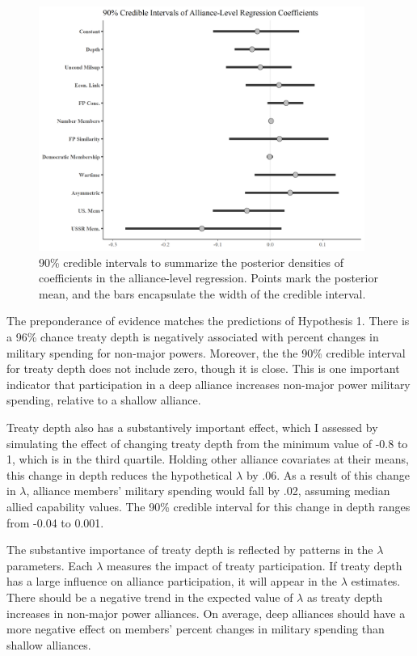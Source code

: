 \documentclass[12pt]{article}
\begin{document}
\begin{figure}[htbp]
	\centering
		\includegraphics[width=0.95\textwidth]{../figures/alliance-reg-nonmaj.png}
	\caption{90\% credible intervals to summarize the posterior densities of coefficients in the alliance-level regression. Points mark the posterior mean, and the bars encapsulate the width of the credible interval.}
	\label{fig:alliance-reg-nonmaj}
\end{figure}


The preponderance of evidence matches the predictions of Hypothesis 1. 
There is a 96\% chance treaty depth is negatively associated with percent changes in military spending for non-major powers.
Moreover, the the 90\% credible interval for treaty depth does not include zero, though it is close. 
This is one important indicator that participation in a deep alliance increases non-major power military spending, relative to a shallow alliance. 




Treaty depth also has a substantively important effect, which I assessed by simulating the effect of changing treaty depth from the minimum value of -0.8 to 1, which is in the third quartile. 
Holding other alliance covariates at their means, this change in depth reduces the hypothetical $\lambda$ by .06.
As a result of this change in $\lambda$, alliance members' military spending would fall by .02, assuming median allied capability values. 
The 90\% credible interval for this change in depth ranges from -0.04 to 0.001. 


The substantive importance of treaty depth is reflected by patterns in the $\lambda$ parameters. 
Each $\lambda$ measures the impact of treaty participation. 
If treaty depth has a large influence on alliance participation, it will appear in the $\lambda$ estimates. 
There should be a negative trend in the expected value of $\lambda$ as treaty depth increases in non-major power alliances.
On average, deep alliances should have a more negative effect on members' percent changes in military spending than shallow alliances.  
\end{document}

